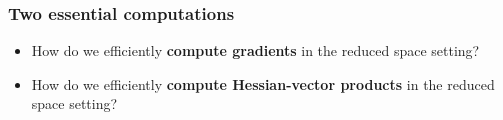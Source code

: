 \documentclass[aspectratio=169,xcolor=dvipsnames,10pt]{beamer}
\begin{document}
\begin{frame}\frametitle{Two essential computations}
\begin{exampleblock}{}
\begin{itemize}
\item How do we efficiently \textbf{compute gradients} in the reduced space setting?
\item How do we efficiently \textbf{compute Hessian-vector products} in the reduced space setting?
\end{itemize}
\end{exampleblock}

\end{frame}
\end{document}
